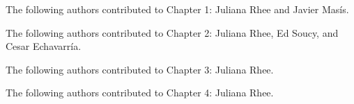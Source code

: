 \noindent The following authors contributed to Chapter 1: Juliana Rhee and Javier Mas\'{i}s. 

\vspace{0.1in}
\noindent The following authors contributed to Chapter 2: Juliana Rhee, Ed Soucy, and Cesar Echavarr\'{i}a. 

\vspace{0.1in}
\noindent The following authors contributed to Chapter 3: Juliana Rhee. 

\vspace{0.1in}
\noindent The following authors contributed to Chapter 4: Juliana Rhee. 

